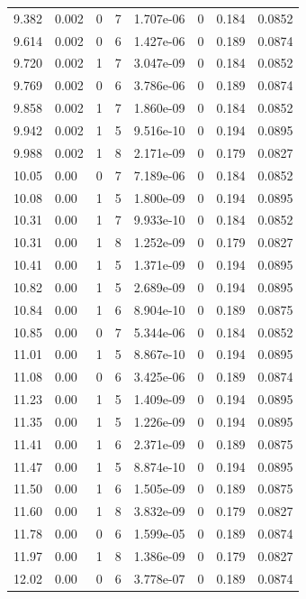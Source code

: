 \documentclass[preview]{standalone}
\begin{document}
{{{\begin{tabular}{L{1.2cm}C{1.2cm} C{0.3cm}C{0.5cm} C{1.4cm}C{1.4cm} C{1.4cm}C{1.4cm}}
  9.382  &  0.002  & 0     &  7 &  1.707e-06  & 0  & 0.184 &  0.0852   \\ 
  9.614  &  0.002  & 0     &  6 &  1.427e-06  & 0  & 0.189 &  0.0874   \\ 
  9.720  &  0.002  & 1     &  7 &  3.047e-09  & 0  & 0.184 &  0.0852   \\ 
  9.769  &  0.002  & 0     &  6 &  3.786e-06  & 0  & 0.189 &  0.0874   \\ 
  9.858  &  0.002  & 1     &  7 &  1.860e-09  & 0  & 0.184 &  0.0852   \\ 
  9.942  &  0.002  & 1     &  5 &  9.516e-10  & 0  & 0.194 &  0.0895   \\ 
  9.988  &  0.002  & 1     &  8 &  2.171e-09  & 0  & 0.179 &  0.0827   \\ 
  10.05  &  0.00  & 0     &  7 &  7.189e-06  & 0  & 0.184 &  0.0852   \\ 
  10.08  &  0.00  & 1     &  5 &  1.800e-09  & 0  & 0.194 &  0.0895   \\ 
  10.31  &  0.00  & 1     &  7 &  9.933e-10  & 0  & 0.184 &  0.0852   \\ 
  10.31  &  0.00  & 1     &  8 &  1.252e-09  & 0  & 0.179 &  0.0827   \\ 
  10.41  &  0.00  & 1     &  5 &  1.371e-09  & 0  & 0.194 &  0.0895   \\ 
  10.82  &  0.00  & 1     &  5 &  2.689e-09  & 0  & 0.194 &  0.0895   \\ 
  10.84  &  0.00  & 1     &  6 &  8.904e-10  & 0  & 0.189 &  0.0875   \\ 
  10.85  &  0.00  & 0     &  7 &  5.344e-06  & 0  & 0.184 &  0.0852   \\ 
  11.01  &  0.00  & 1     &  5 &  8.867e-10  & 0  & 0.194 &  0.0895   \\ 
  11.08  &  0.00  & 0     &  6 &  3.425e-06  & 0  & 0.189 &  0.0874   \\ 
  11.23  &  0.00  & 1     &  5 &  1.409e-09  & 0  & 0.194 &  0.0895   \\ 
  11.35  &  0.00  & 1     &  5 &  1.226e-09  & 0  & 0.194 &  0.0895   \\ 
  11.41  &  0.00  & 1     &  6 &  2.371e-09  & 0  & 0.189 &  0.0875   \\ 
  11.47  &  0.00  & 1     &  5 &  8.874e-10  & 0  & 0.194 &  0.0895   \\ 
  11.50  &  0.00  & 1     &  6 &  1.505e-09  & 0  & 0.189 &  0.0875   \\ 
  11.60  &  0.00  & 1     &  8 &  3.832e-09  & 0  & 0.179 &  0.0827   \\ 
  11.78  &  0.00  & 0     &  6 &  1.599e-05  & 0  & 0.189 &  0.0874   \\ 
  11.97  &  0.00  & 1     &  8 &  1.386e-09  & 0  & 0.179 &  0.0827   \\ 
  12.02  &  0.00  & 0     &  6 &  3.778e-07  & 0  & 0.189 &  0.0874   \\ 
\hline 
\end{tabular} 

}}}
\end{document}
